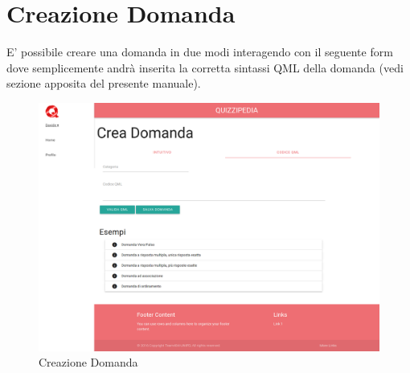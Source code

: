 \documentclass[a4paper,11pt]{article}
\begin{document}
	\section{Creazione Domanda}
	E' possibile creare una domanda in due modi interagendo con il seguente form dove semplicemente andrà inserita la corretta sintassi QML della domanda (vedi sezione apposita del presente manuale).\\
	
	\begin{figure}[h!]
	\begin{center}
	\includegraphics[scale=0.2]{../images/QuestionFormQML.png}
	\caption{Creazione Domanda}
	\end{center}
	\end{figure}
	
	\newpage
\end{document}
